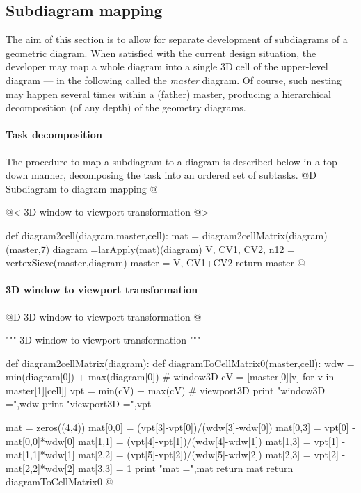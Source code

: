 \documentclass[11pt,oneside]{article}	%
\begin{document}
\subsection{Subdiagram mapping}

The aim of this section is to allow for separate development of subdiagrams of a geometric diagram.
When satisfied with the current design situation,  the developer may map a whole diagram into a single 3D cell of the upper-level diagram --- in the following called the \emph{master} diagram.
Of course, such nesting may happen several times within a (father) master, producing a hierarchical decomposition (of any depth) of the geometry diagrams.


\paragraph{Task decomposition}
The procedure to map a subdiagram to a diagram is described below in a top-down manner,
decomposing the task into an ordered set of subtasks.
@D Subdiagram to diagram mapping
@{
@< 3D window to viewport transformation @>

def diagram2cell(diagram,master,cell):
	mat = diagram2cellMatrix(diagram)(master,7)
	diagram =larApply(mat)(diagram)	
	V, CV1, CV2, n12 = vertexSieve(master,diagram)
	master = V, CV1+CV2
	return master
@}

\paragraph{3D window to viewport transformation}
@D 3D window to viewport transformation
@{""" 3D window to viewport transformation """

def diagram2cellMatrix(diagram):
	def diagramToCellMatrix0(master,cell):
		wdw = min(diagram[0]) + max(diagram[0])			# window3D
		cV = [master[0][v] for v in master[1][cell]]
		vpt = min(cV) + max(cV)								# viewport3D
		print "\n window3D =",wdw
		print "\n viewport3D =",vpt
		
		mat = zeros((4,4))
		mat[0,0] = (vpt[3]-vpt[0])/(wdw[3]-wdw[0])
		mat[0,3] = vpt[0] - mat[0,0]*wdw[0]
		mat[1,1] = (vpt[4]-vpt[1])/(wdw[4]-wdw[1])
		mat[1,3] = vpt[1] - mat[1,1]*wdw[1]
		mat[2,2] = (vpt[5]-vpt[2])/(wdw[5]-wdw[2])
		mat[2,3] = vpt[2] - mat[2,2]*wdw[2]
		mat[3,3] = 1
		print "\n mat =",mat
		return mat
	return diagramToCellMatrix0
@}
\end{document}
